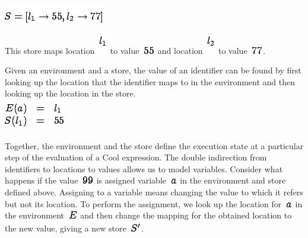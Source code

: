 \documentclass[]{article}
\begin{document}
\includegraphics{img120.png}

This store maps location \includegraphics{img118.png} to value
\includegraphics{img121.png} and location \includegraphics{img119.png}
to value \includegraphics{img122.png}.

Given an environment and a store, the value of an identifier can be
found by first looking up the location that the identifier maps to in
the environment and then looking up the location in the store. \\

\includegraphics{img123.png}

Together, the environment and the store define the execution state at a
particular step of the evaluation of a Cool expression. The double
indirection from identifiers to locations to values allows us to model
variables. Consider what happens if the value
\includegraphics{img124.png} is assigned variable
\includegraphics{img30.png} in the environment and store defined above.
Assigning to a variable means changing the value to which it refers but
not its location. To perform the assignment, we look up the location for
\includegraphics{img30.png} in the environment
\includegraphics{img125.png} and then change the mapping for the
obtained location to the new value, giving a new store
\includegraphics{img126.png}.
\end{document}
